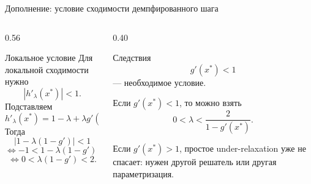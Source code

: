 \documentclass[aspectratio=169,10pt]{beamer}
\begin{document}
\begin{frame}{Дополнение: условие сходимости демпфированного шага}
  \small
  \begin{columns}[T,onlytextwidth]
    \begin{column}{0.56\textwidth}
      \begin{block}{Локальное условие}
        \scriptsize
        Для локальной сходимости нужно
        \[
          |h'_\lambda(x^*)|<1.
        \]
        Подставляем
        \[
          h'_\lambda(x^*)=1-\lambda+\lambda g'(x^*)
          =1-\lambda\bigl(1-g'(x^*)\bigr).
        \]
        Тогда
        \[
          |1-\lambda(1-g')|<1
        \]
        \[
          \Longleftrightarrow
          -1<1-\lambda(1-g')<1
        \]
        \[
          \Longleftrightarrow
          0<\lambda(1-g')<2.
        \]
      \end{block}
    \end{column}
    \begin{column}{0.40\textwidth}
      \begin{block}{Следствия}
        \scriptsize
        \[
          \boxed{g'(x^*)<1}
        \]
        — необходимое условие.

        \vspace{0.35em}
        Если $g'(x^*)<1$, то можно взять
        \[
          0<\lambda<\frac{2}{1-g'(x^*)}.
        \]

        \vspace{0.35em}
        Если $g'(x^*)>1$, простое under-relaxation
        уже не спасает: нужен другой решатель
        или другая параметризация.
      \end{block}
    \end{column}
  \end{columns}
\end{frame}
\end{document}
